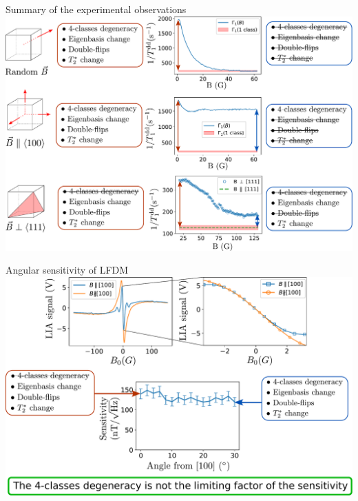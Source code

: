 \documentclass{beamer}
\begin{document}
\begin{frame}{Summary of the experimental observations}
\centering
\includegraphics[width=\textwidth,height=0.85\textheight,keepaspectratio]{shema_summary_exp}
\end{frame}

\begin{frame}{Angular sensitivity of LFDM}
\centering
\includegraphics[width=\textwidth,height=0.85\textheight,keepaspectratio]{Slide_angular_sensitivity}
\end{frame}
\end{document}
